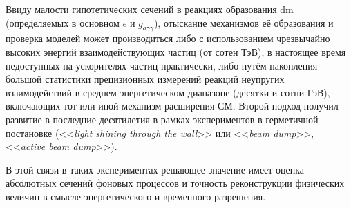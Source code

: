 

Ввиду малости гипотетических сечений в реакциях образования
\acrshort{dm} (определяемых в основном $\epsilon$ и $g_{a \gamma \gamma}$),
отыскание механизмов её образования и проверка моделей может производиться либо
с использованием чрезвычайно высоких энергий взаимодействующих частиц (от сотен ТэВ), в настоящее время недоступных на ускорителях частиц практически,
либо путём накопления большой статистики прецизионных измерений реакций неупругих
взаимодействий в среднем энергетическом диапазоне (десятки и сотни ГэВ), включающих
тот или иной механизм расширения СМ. Второй подход получил
развитие в последние десятилетия в рамках экспериментов в герметичной постановке
(<<\emph{light shining through the wall}>> или <<\emph{beam dump}>>, <<\emph{active beam dump}>>). 


В этой связи в таких экспериментах решающее значение имеет оценка
абсолютных сечений фоновых процессов  и точность реконструкции физических
величин в смысле энергетического и временного разрешения.
